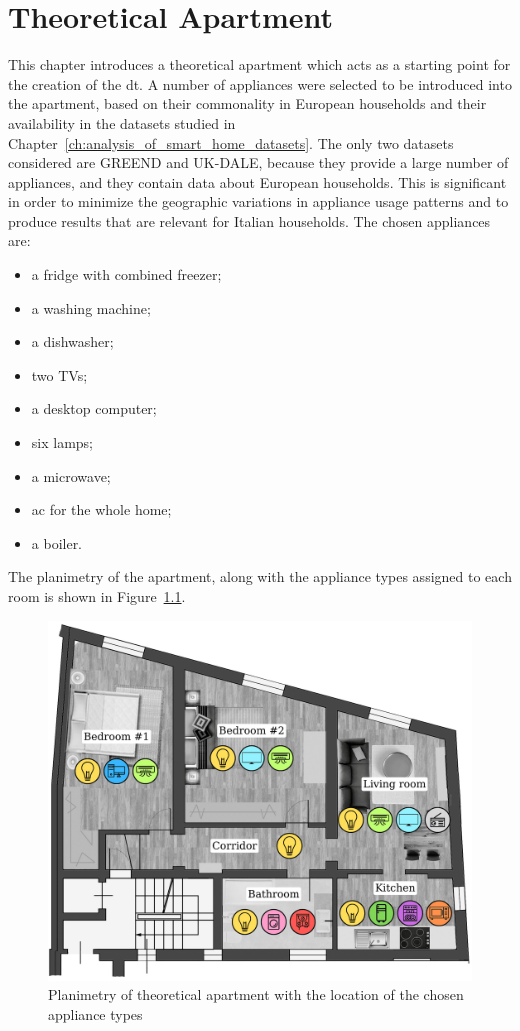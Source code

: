 \chapter{Theoretical Apartment}\label{ch:theoretical_apartment}

This chapter introduces a theoretical apartment which acts as a starting point for the creation of the \acrshort{dt}. A number of appliances were selected to be introduced into the apartment, based on their commonality in European households and their availability in the datasets studied in Chapter~\ref{ch:analysis_of_smart_home_datasets}. The only two datasets considered are GREEND and UK-DALE, because they provide a large number of appliances, and they contain data about European households. This is significant in order to minimize the geographic variations in appliance usage patterns and to produce results that are relevant for Italian households. The chosen appliances are:
\begin{itemize}
    \item a fridge with combined freezer;
    \item a washing machine;
    \item a dishwasher;
    \item two TVs;
    \item a desktop computer;
    \item six lamps;
    \item a microwave;
    \item \acrshort{ac} for the whole home;
    \item a boiler.
\end{itemize}
The planimetry of the apartment, along with the appliance types assigned to each room is shown in Figure~\ref{fig:apartment_planimetry}.

\begin{figure}
    \centering
    \includegraphics[width=0.75\linewidth]{images/planimetry.png}
    \caption{Planimetry of theoretical apartment with the location of the chosen appliance types}
    \label{fig:apartment_planimetry}
\end{figure}

